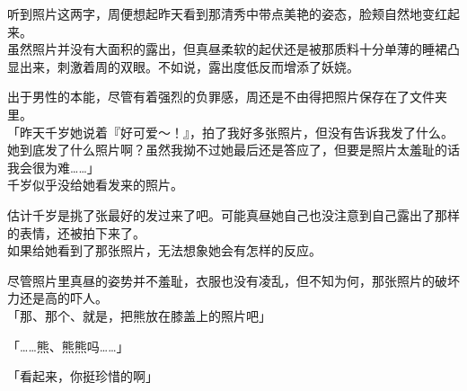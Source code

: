 听到照片这两字，周便想起昨天看到那清秀中带点美艳的姿态，脸颊自然地变红起来。\\

虽然照片并没有大面积的露出，但真昼柔软的起伏还是被那质料十分单薄的睡裙凸显出来，刺激着周的双眼。不如说，露出度低反而增添了妖娆。

出于男性的本能，尽管有着强烈的负罪感，周还是不由得把照片保存在了文件夹里。\\

「昨天千岁她说着『好可爱～！』，拍了我好多张照片，但没有告诉我发了什么。她到底发了什么照片啊？虽然我拗不过她最后还是答应了，但要是照片太羞耻的话我会很为难……」\\

千岁似乎没给她看发来的照片。

估计千岁是挑了张最好的发过来了吧。可能真昼她自己也没注意到自己露出了那样的表情，还被拍下来了。\\

如果给她看到了那张照片，无法想象她会有怎样的反应。

尽管照片里真昼的姿势并不羞耻，衣服也没有凌乱，但不知为何，那张照片的破坏力还是高的吓人。\\

「那、那个、就是，把熊放在膝盖上的照片吧」

「……熊、熊熊吗……」

「看起来，你挺珍惜的啊」\\

